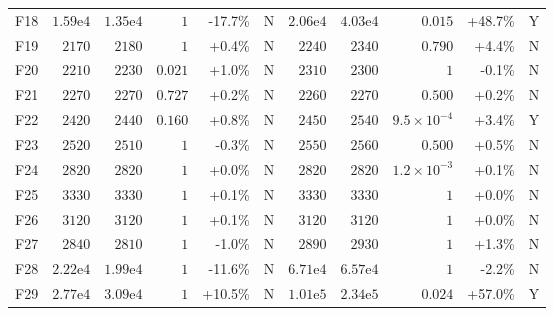 \begin{tabular}{lrrrrcrrrrc}
F18 & $1.59\mathrm{e}{4}$ & $1.35\mathrm{e}{4}$ & $1$ & -17.7\% & N & $2.06\mathrm{e}{4}$ & $4.03\mathrm{e}{4}$ & $0.015$ & +48.7\% & Y \\
F19 & $2170$ & $2180$ & $1$ & +0.4\% & N & $2240$ & $2340$ & $0.790$ & +4.4\% & N \\
F20 & $2210$ & $2230$ & $0.021$ & +1.0\% & N & $2310$ & $2300$ & $1$ & -0.1\% & N \\
F21 & $2270$ & $2270$ & $0.727$ & +0.2\% & N & $2260$ & $2270$ & $0.500$ & +0.2\% & N \\
F22 & $2420$ & $2440$ & $0.160$ & +0.8\% & N & $2450$ & $2540$ & $9.5\times10^{-4}$ & +3.4\% & Y \\
F23 & $2520$ & $2510$ & $1$ & -0.3\% & N & $2550$ & $2560$ & $0.500$ & +0.5\% & N \\
F24 & $2820$ & $2820$ & $1$ & +0.0\% & N & $2820$ & $2820$ & $1.2\times10^{-3}$ & +0.1\% & N \\
F25 & $3330$ & $3330$ & $1$ & +0.1\% & N & $3330$ & $3330$ & $1$ & +0.0\% & N \\
F26 & $3120$ & $3120$ & $1$ & +0.1\% & N & $3120$ & $3120$ & $1$ & +0.0\% & N \\
F27 & $2840$ & $2810$ & $1$ & -1.0\% & N & $2890$ & $2930$ & $1$ & +1.3\% & N \\
F28 & $2.22\mathrm{e}{4}$ & $1.99\mathrm{e}{4}$ & $1$ & -11.6\% & N & $6.71\mathrm{e}{4}$ & $6.57\mathrm{e}{4}$ & $1$ & -2.2\% & N \\
F29 & $2.77\mathrm{e}{4}$ & $3.09\mathrm{e}{4}$ & $1$ & +10.5\% & N & $1.01\mathrm{e}{5}$ & $2.34\mathrm{e}{5}$ & $0.024$ & +57.0\% & Y \\
\bottomrule
\end{tabular}
